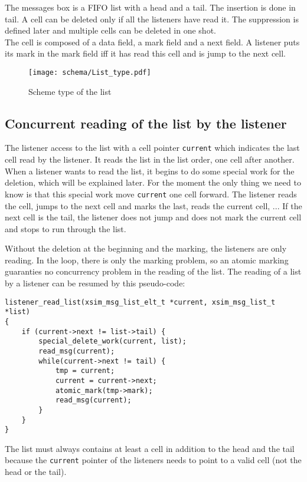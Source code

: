 The messages box is a FIFO list with a head and a tail. The insertion is done in tail.
A cell can be deleted only if all the listeners have read it. The suppression is defined later
and multiple cells can be deleted in one shot.\\

The cell is composed of a data field, a mark field and a next field. 
A listener puts its mark in the mark field iff it has read this cell and is jump to the 
next cell.

\begin{figure}[h]
\begin{center}
    \texttt{[image: schema/List\_type.pdf]}
	\caption{Scheme type of the list}
	\label{List_type}
\end{center}
\end{figure}

\subsection{Concurrent reading of the list by the listener}
The listener access to the list with a cell pointer \verb|current| which indicates
the last cell read by the listener. It reads the list in the list order, one cell
after another. When a listener wants to read the list, it begins
to do some special work for the deletion, which will be explained later. For the moment
the only thing we need to know is that this special work move \verb|current| one cell
forward.
The listener reads the cell, jumps to the next cell and marks the last, reads 
the current cell, ...
If the next cell is the tail, the listener does not jump and does not mark the 
current cell and stops to run through the list. 

Without the deletion at the beginning and the marking, the listeners are only reading.
In the loop, there is only the marking problem, so an atomic marking guaranties no 
concurrency problem in the reading of the list. 
The reading of a list by a listener can be resumed by this pseudo-code:
\begin{verbatim}
listener_read_list(xsim_msg_list_elt_t *current, xsim_msg_list_t *list)
{
    if (current->next != list->tail) {
        special_delete_work(current, list);
        read_msg(current);
        while(current->next != tail) {
            tmp = current;
            current = current->next;
            atomic_mark(tmp->mark);
            read_msg(current);
        }
    }
}
\end{verbatim}
The list must always contains at least a cell in addition to the head and the tail 
because the \verb|current| pointer of the listeners needs to point to a valid cell 
(not the head or the tail).




